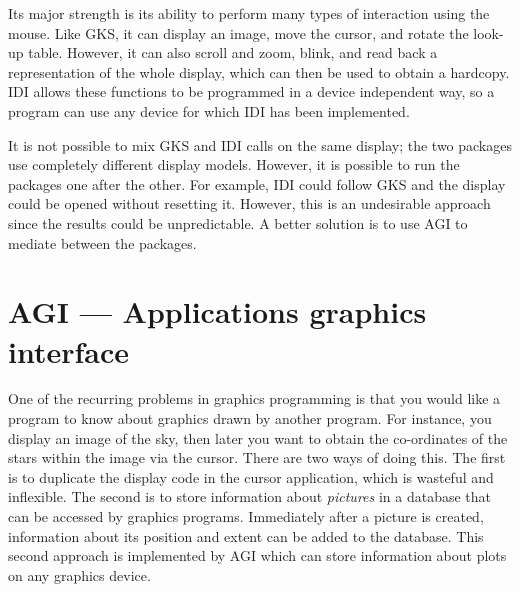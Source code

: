 Its major strength is its ability to perform many types of interaction using the
mouse.
Like GKS, it can display an image, move the cursor, and rotate the look-up
table.
However, it can also scroll and zoom, blink, and read back a representation of
the whole display, which can then be used to obtain a hardcopy.
IDI allows these functions to be programmed in a device independent way, so
a program can use any device for which IDI has been implemented.

It is not possible to mix GKS and IDI calls on the same display; the two
packages use completely different display models.
However, it is possible to run the packages one after the other.
For example, IDI could follow GKS and the display could be opened without
resetting it.
However, this is an undesirable approach since the results could be
unpredictable.
A better solution is to use AGI to mediate between the packages.

\section{AGI --- Applications graphics interface}

One of the recurring problems in graphics programming is that you would 
like a program to know about graphics drawn by another program.
For instance, you display an image of the sky, then later you want to obtain
the co-ordinates of the stars within the image via the cursor.
There are two ways of doing this.
The first is to duplicate the display code in the cursor application, which is
wasteful and inflexible.
The second is to store information about {\em pictures} in a database that can
be accessed by graphics programs.
Immediately after a picture is created, information about its position and
extent can be added to the database.
This second approach is implemented by AGI which can store information about
plots on any graphics device.

